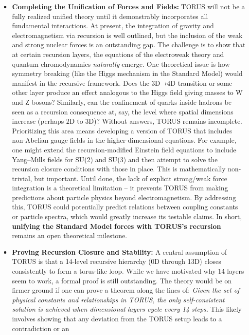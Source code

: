 \documentclass[]{article}
\begin{document}
\begin{itemize}
\item
  \textbf{Completing the Unification of Forces and Fields:} TORUS will
  not be a fully realized unified theory until it demonstrably
  incorporates all fundamental interactions. At present, the integration
  of gravity and electromagnetism via recursion is well outlined, but
  the inclusion of the weak and strong nuclear forces is an outstanding
  gap​. The challenge is to show that at certain recursion layers, the
  equations of the electroweak theory and quantum chromodynamics
  \emph{naturally} emerge. One theoretical issue is how symmetry
  breaking (like the Higgs mechanism in the Standard Model) would
  manifest in the recursive framework. Does the 3D→4D transition or some
  other layer produce an effect analogous to the Higgs field giving
  masses to W and Z bosons? Similarly, can the confinement of quarks
  inside hadrons be seen as a recursion consequence at, say, the level
  where spatial dimensions increase (perhaps 2D to 3D)? Without answers,
  TORUS remains incomplete. Prioritizing this area means developing a
  version of TORUS that includes non-Abelian gauge fields in the
  higher-dimensional equations. For example, one might extend the
  recursion-modified Einstein field equations to include Yang--Mills
  fields for SU(2) and SU(3) and then attempt to solve the recursion
  closure conditions with those in place. This is mathematically
  non-trivial, but important. Until done, the lack of explicit
  strong/weak force integration is a theoretical limitation -- it
  prevents TORUS from making predictions about particle physics beyond
  electromagnetism. By addressing this, TORUS could potentially predict
  relations between coupling constants or particle spectra, which would
  greatly increase its testable claims. In short, \textbf{unifying the
  Standard Model forces with TORUS's recursion} remains an open
  theoretical milestone.
\item
  \textbf{Proving Recursion Closure and Stability:} A central assumption
  of TORUS is that a 14-level recursive hierarchy (0D through 13D)
  closes consistently to form a torus-like loop. While we have motivated
  why 14 layers seem to work, a formal proof is still outstanding. The
  theory would be on firmer ground if one can prove a theorem along the
  lines of: \emph{Given the set of physical constants and relationships
  in TORUS, the only self-consistent solution is achieved when
  dimensional layers cycle every 14 steps.} This likely involves showing
  that any deviation from the TORUS setup leads to a contradiction or an

\end{itemize}
\end{document}
